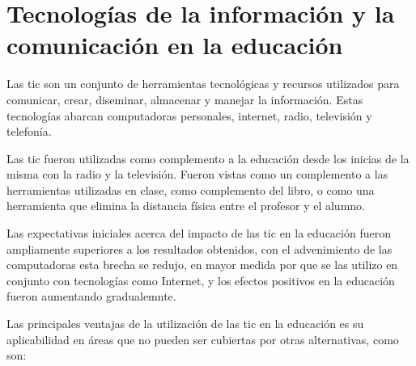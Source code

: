 \chapter{Tecnologías de la información y la comunicación en la educación}

Las \Gls{tic} son un conjunto de herramientas tecnológicas y recursos utilizados
para comunicar, crear, diseminar, almacenar y manejar la
información\cite{unesco:ict}. Estas tecnologías abarcan computadoras personales,
internet, radio, televisión y telefonía\cite{tinio:ict}.

Las \Gls{tic} fueron utilizadas como complemento a la educación desde los
inicias de la misma con la radio y la televisión. Fueron vistas como un
complemento a las herramientas utilizadas en clase, como complemento del libro,
o como una herramienta que elimina la distancia física entre el profesor y el
alumno\cite{unesco:ict}. 

Las expectativas iniciales acerca del impacto de las \Gls{tic} en la educación
fueron ampliamente superiores a los resultados obtenidos\cite{unesco:ict}, con
el advenimiento de las computadoras esta brecha se redujo, en mayor medida por
que se las utilizo en conjunto con tecnologías como Internet, y los efectos
positivos en la educación fueron aumentando gradualemnte\cite{unesco:ict}.

Las principales ventajas de la utilización de las \Gls{tic} en la educación es
su aplicabilidad en áreas que no pueden ser cubiertas por otras alternativas,
como son:

